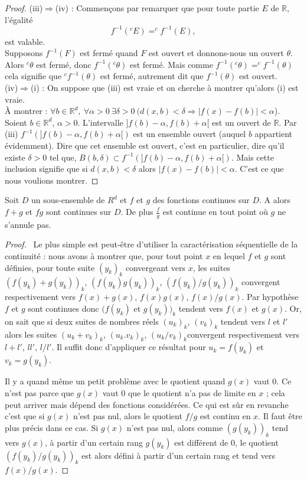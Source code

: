 \documentclass[class=report,crop=false]{standalone}
\begin{document}
\begin{proof}
(iii)$\Rightarrow$(iv) : Commen\c cons par remarquer que pour toute partie $E$ de $\mathbb{R}$, l'égalité
$$
f^{-1}(^cE)=^c f^{-1}(E),
$$
est valable.\\
Supposons $f^{-1}(F)$ est fermé quand $F$ est ouvert et donnons-nous un ouvert $\theta$. Alors $^c\theta$ est fermé, donc $f^{-1}(^c\theta)$ est fermé. Mais comme $f^{-1}(^c\theta)=^c f^{-1}(\theta)$ cela signifie que $^c f^{-1}(\theta)$ est fermé, autrement dit que $ f^{-1}(\theta)$ est ouvert.\\


(iv)$\Rightarrow$(i) : On suppose que (iii) est vraie et on cherche \`a montrer qu'alors (i) est vraie. \\
\`A montrer : $\forall b\in \mathbb{R}^d,\  \forall \alpha>0\ \exists \delta>0\ (d(x,b)<\delta\Rightarrow |f(x)-f(b)|<\alpha$).\\
Soient $b\in \mathbb{R}^d$, $\alpha>0$. L'intervalle $]f(b)-\alpha,f(b)+\alpha[$ est un ouvert de $ \mathbb{R}$. Par (iii) $f^{-1}(  ]f(b)-\alpha,f(b)+\alpha[)$ est un ensemble ouvert (auquel $b$ appartient évidemment). Dire que cet ensemble est ouvert, c'est en particulier, dire qu'il existe $\delta>0$ tel que, $B(b,\delta)\subset f^{-1}(  ]f(b)-\alpha,f(b)+\alpha[)$. Mais cette inclusion signifie que si $d(x,b)<\delta$ alors $|f(x)-f(b)|<\alpha$. C'est ce que nous voulions montrer.\end{proof}

\begin{theoreme}
Soit $D$ un sous-ensemble de $R^d$ et $f$ et $g$ des fonctions continues sur $D$. A alors $f + g$ et $fg$ sont continues sur $D$. De plus $\frac{f}{g}$ est continue en tout point o\`u $g$ ne s'annule pas.
\end{theoreme}


\begin{proof} \rm \ 
Le plus simple est peut-\^etre d'utiliser la caractérisation séquentielle de la continuité : nous avons \`a montrer que,
pour tout point $x$ en lequel $f$ et $g$ sont définies, pour toute suite $(y_k)_k$ convergeant vers $x$, les suites $(f(y_k)+g(y_k))_k$, $(f(y_k)g(y_k))_k$, $(f(y_k)/g(y_k))_k$ convergent respectivement vers $f(x)+g(x)$, $f(x)g(x)$, $f(x)/g(x)$.
Par hypoth\`ese $f$ et $g$ sont continues donc $(f(y_k)$ et $g(y_k))_k$ tendent vers $f(x)$ et $g(x)$.
Or, on sait que si deux suites de nombres réels $(u_k)_k$, $(v_k)_k$ tendent vers $l$ et $l'$ alors les suites $(u_k+v_k)_k$, $(u_k.v_k)_k$, $(u_k/v_k)_k$convergent respectivement vers $l+l'$, $ll'$, $l/l'$. Il suffit donc d'appliquer ce résultat pour $u_k=f(y_k)$ et $v_k=g(y_k)$.

Il y a quand m\^eme un petit probl\`eme avec le quotient quand $g(x)$ vaut 0. Ce n'est pas parce que $g(x)$ vaut 0 que le quotient n'a pas de limite en $x$ ; cela peut arriver mais dépend des fonctions considérées. Ce qui est s\^ur en revanche c'est que si $g(x)$ n'est pas nul, alors le quotient $f/g$ est continu en $x$. Il faut \^etre plus précis dans ce cas. Si $g(x)$ n'est pas nul, alors comme $(g(y_k))_k$ tend vers $g(x)$, \`a partir d'un certain rang $g(y_k)$ est différent de 0, le quotient $(f(y_k)/g(y_k))_k$ est alors défini \`a partir d'un certain rang et tend vers $f(x)/g(x)$.\end{proof}
\end{document}
